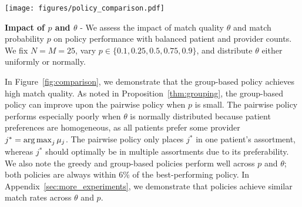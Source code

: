 \begin{example}
\label{ex:comparison}
\begin{figure*}
    \centering 
    \texttt{[image: figures/policy\_comparison.pdf]}
    \caption{The greedy policy performs poorly when $p=0.9$ compared to smaller $p$, for both uniform and normal $\theta$, while the pairwise policy performs worse for smaller $p$, especially when $\theta$ is normally distributed. The group-based policy gets around these issues and performs well when $p$ is large and small.} 
    \label{fig:comparison}
\end{figure*}
\textbf{Impact of $p$ and $\theta$} - We assess the impact of match quality $\theta$ and match probability $p$ on policy performance with balanced patient and provider counts. 
We fix $N=M=25$, vary $p \in \{0.1,0.25,0.5,0.75,0.9\}$, and distribute $\theta$ either uniformly or normally. 

In Figure~\ref{fig:comparison}, we demonstrate that the group-based policy achieves high match quality. 
As noted in Proposition~\ref{thm:grouping}, the group-based policy can improve upon the pairwise policy when $p$ is small. 
The pairwise policy performs especially poorly when $\theta$ is normally distributed because patient preferences are homogeneous, as all patients prefer some provider $j^{*} = \operatorname*{arg\,max}_{j} \mu_{j}$. 
The pairwise policy only places $j^{*}$ in one patient's assortment, whereas $j^{*}$ should optimally be in multiple assortments due to its preferability. 
We also note the greedy and group-based policies perform well across $p$ and $\theta$; both policies are always within 6\% of the best-performing policy. 
In Appendix~\ref{sec:more_experiments}, we demonstrate that policies achieve similar match rates across $\theta$ and $p$. 

\begin{figure*}
    \centering 


\end{figure*}
\end{example}
